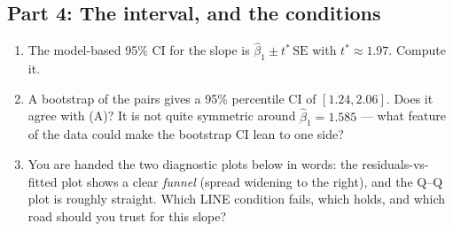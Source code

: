 \documentclass{article}
\begin{document}
\subsection*{Part 4: The interval, and the conditions}

\begin{enumerate}[label={\bfseries (\Alph*)},itemsep=.8em]
\item The model-based 95\% CI for the slope is $\hat\beta_1 \pm t^\ast\,\mathrm{SE}$ with $t^\ast \approx 1.97$. Compute it. \\[2.5em]
\item A bootstrap of the pairs gives a 95\% percentile CI of $[1.24, 2.06]$. Does it agree with (A)? It is not quite symmetric around $\hat\beta_1 = 1.585$ --- what feature of the data could make the bootstrap CI lean to one side? \\[3.5em]
\item You are handed the two diagnostic plots below in words: the residuals-vs-fitted plot shows a clear \emph{funnel} (spread widening to the right), and the Q--Q plot is roughly straight. Which LINE condition fails, which holds, and which road should you trust for this slope? \\[4em]
\end{enumerate}
\end{document}
